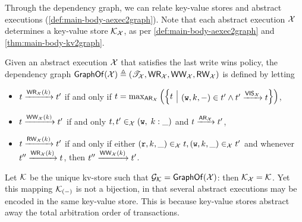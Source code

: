 Through the dependency graph, we can relate key-value stores and abstract executions (\cref{def:main-body-aexec2graph}).
Note that each abstract execution $\mathcal{X}$ determines a key-value store 
$\mathcal{K}_{\mathcal{X}}$, as per \cref{def:main-body-aexec2graph} and \cref{thm:main-body-kv2graph}. 

\begin{definition}
\label{def:main-body-aexec2graph}
Given an abstract execution $\mathcal{X}$ that satisfies the last write wins policy,
the dependency graph $\mathsf{GraphOf}(\mathcal{X}) \triangleq (\mathscr{T}_{\mathcal{X}}, \mathsf{WR}_{\mathcal{X}}, 
\mathsf{WW}_{\mathcal{X}}, \mathsf{RW}_{\mathcal{X}})$ is defined by letting
\begin{itemize}
\item $t \xrightarrow{\mathsf{WR}_{\mathcal{X}}(k)} t'$ if and only if 
    $\txid = \max_{\AR_{\aexec}}\left( \Setcon{\txid}{(\otW,\ke,\stub) \in \txid' \land \txid' \toEdge{\VIS_\aexec} \txid } \right)$, 
\item $t \xrightarrow{\mathsf{WW}_{\mathcal{X}}(k)} t'$ if and only 
$t, t' \in_{\mathcal{X}} (\textnormal{\texttt w}, \;k: \_)$ 
and $t \xrightarrow{\mathsf{AR}_{\mathcal{X}}} t'$,
\item $t \xrightarrow{\mathsf{RW}_{\mathcal{X}}(k)} t'$ if and only if either 
$(\textnormal{\texttt r}, k, \_) \in_{\mathcal{X}} t, (\textnormal{\texttt w}, k, \_) \in_{\mathcal{X}} t'$ and 
whenever $t'' \xrightarrow{\mathsf{WR}_{\mathcal{X}}(k)} t$, 
then $t'' \xrightarrow{\mathsf{WW}_{\mathcal{X}}(k)} t'$.
\end{itemize}
\end{definition}

Let $\mathcal{K}$ be the unique kv-store such that $\mathcal{G}_{\mathcal{K}} = \mathsf{GraphOf}(\mathcal{X})$: then 
$\mathcal{K}_{\mathcal{X}} = \mathcal{K}$. 
Yet this mapping $\mathcal{K}_{(-)}$ is not a bijection, 
in that several abstract executions may be encoded in the same key-value store. 
This is because key-value stores abstract away the total arbitration order of transactions.


